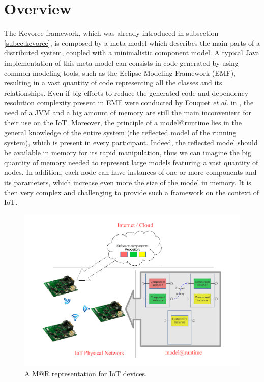 \section{Overview}
\label{sec:MAR_overview}
The Kevoree framework, which was already introduced in subsection \ref{subec:kevoree}, is composed by a meta-model which describes the main parts of a distributed system, coupled with a minimalistic component model.
A typical Java implementation of this meta-model can consists in code generated by using common modeling tools, such as the Eclipse Modeling Framework (EMF)\cite{steinberg2008emf}, resulting in a vast quantity of code representing all the classes and its relationships.
Even if big efforts to reduce the generated code and dependency resolution complexity present in EMF were conducted by Fouquet \textit{et al.} in \cite{fouquet2012eclipse}, the need of a JVM and a big amount of memory are still the main inconvenient for their use on the IoT.
Moreover, the principle of a model@runtime lies in the general knowledge of the entire system (the reflected model of the running system), which is present in every participant.
Indeed, the reflected model should be available in memory for its rapid manipulation, thus we can imagine the big quantity of memory needed to represent large models featuring a vast quantity of nodes.
In addition, each node can have instances of one or more components and its parameters, which increase even more the size of the model in memory.
It is then very complex and challenging to provide such a framework on the context of IoT.

\begin{figure}[]
	\centering
	\includegraphics[width=1\columnwidth]{chapters/modelsAtRuntimeContiki.images/MAR_IOT.pdf}
	\caption{A M@R representation for IoT devices.}
	\label{fig:MAR_IOT}
\end{figure}

